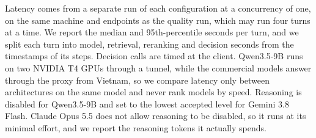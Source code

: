 Latency comes from a separate run of each configuration at a concurrency of one, on the same machine and endpoints as the quality run, which may run four turns at a time. We report the median and 95th-percentile seconds per turn, and we split each turn into model, retrieval, reranking and decision seconds from the timestamps of its steps. Decision calls are timed at the client. Qwen3.5-9B runs on two NVIDIA T4 GPUs through a tunnel, while the commercial models answer through the proxy from Vietnam, so we compare latency only between architectures on the same model and never rank models by speed. Reasoning is disabled for Qwen3.5-9B and set to the lowest accepted level for Gemini 3.8 Flash. Claude Opus 5.5 does not allow reasoning to be disabled, so it runs at its minimal effort, and we report the reasoning tokens it actually spends.
